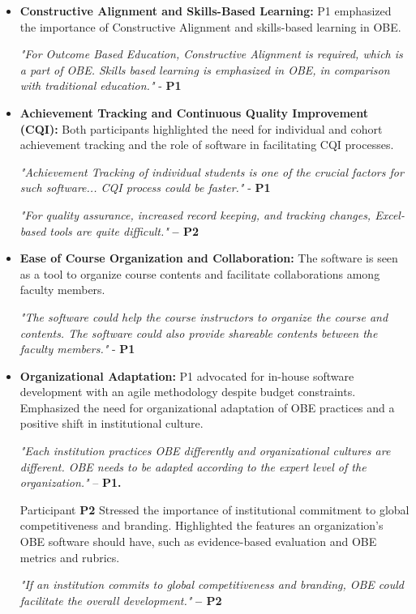 \documentclass[journal,onecolumn]{IEEEtran}
\begin{document}
\begin{itemize}
    \item \textbf{Constructive Alignment and Skills-Based Learning:} P1 emphasized the importance of Constructive Alignment and skills-based learning in OBE.


\textit{"For Outcome Based Education, Constructive Alignment is required, which is a part of OBE. Skills based learning is emphasized in OBE, in comparison with traditional education."} - \textbf{P1}

\item\textbf{Achievement Tracking and Continuous Quality Improvement (CQI):} Both participants highlighted the need for individual and cohort achievement tracking and the role of software in facilitating CQI processes.

\textit{"Achievement Tracking of individual students is one of the crucial factors for such software... CQI process could be faster."} - \textbf{P1}

\textit{"For quality assurance, increased record keeping, and tracking changes, Excel-based tools are quite difficult." }\textbf{– P2}

\item\textbf{Ease of Course Organization and Collaboration:} The software is seen as a tool to organize course contents and facilitate collaborations among faculty members.

\textit{"The software could help the course instructors to organize the course and contents. The software could also provide shareable contents between the faculty members."} - \textbf{P1}

\item\textbf{Organizational Adaptation: }P1 advocated for in-house software development with an agile methodology despite budget constraints. Emphasized the need for organizational adaptation of OBE practices and a positive shift in institutional culture.

\textit{"Each institution practices OBE differently and organizational cultures are different. OBE needs to be adapted according to the expert level of the organization." }– \textbf{P1.}

Participant \textbf{P2 }Stressed the importance of institutional commitment to global competitiveness and branding. Highlighted the features an organization's OBE software should have, such as evidence-based evaluation and OBE metrics and rubrics.

\textit{"If an institution commits to global competitiveness and branding, OBE could facilitate the overall development."}\textbf{ – P2}


\end{itemize}
\end{document}
